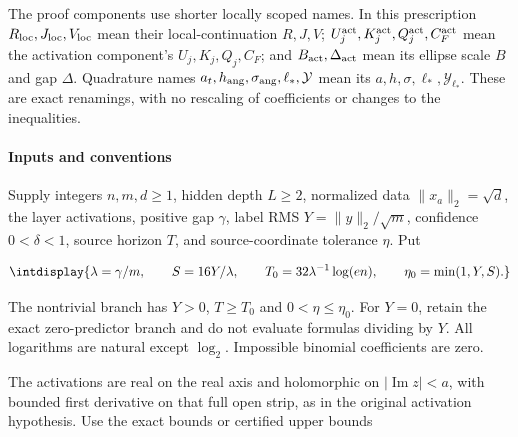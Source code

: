 
The proof components use shorter locally scoped names. In this prescription \(R_{\rm loc},\allowbreak J_{\rm loc},\allowbreak V_{\rm loc}\) mean their local-continuation \(R,\allowbreak J,\allowbreak V\); \(U_j^{\rm act},\allowbreak K_j^{\rm act},\allowbreak Q_j^{\rm act},\allowbreak C_F^{\rm act}\) mean the activation component's \(U_j,\allowbreak K_j,\allowbreak Q_j,\allowbreak C_F\); and \(B_{\rm act},\allowbreak \Delta_{\rm act}\) mean its ellipse scale \(B\) and gap \(\Delta\). Quadrature names \(a_t,\allowbreak h_{\rm ang},\allowbreak \sigma_{\rm ang},\allowbreak \ell_*,\allowbreak \mathcal Y\) mean its \(a,\allowbreak h,\allowbreak \sigma,\allowbreak \ell_*,\allowbreak \mathcal Y_{\ell_*}\). These are exact renamings, with no rescaling of coefficients or changes to the inequalities.


\paragraph{Inputs and conventions}
\label{int:setup-orders-detail-1}
\mbox{}\par\smallskip


Supply integers \(n,\allowbreak m,\allowbreak d\ge1\), hidden depth \(L\ge2\), normalized data \(\|x_a\|_2=\sqrt d\), the layer activations, positive gap \(\gamma\), label RMS \(Y=\|y\|_2/\sqrt m\), confidence \(0<\delta<1\), source horizon \(T\), and source-coordinate tolerance \(\eta\). Put


\begingroup\renewcommand{\theHequation}{intdisplay.233}
\begin{equation*}
\intdisplay{
\lambda=\gamma/m,\qquad S=16Y/\lambda,\qquad
T_0=32\lambda^{-1}\log(en),\qquad \eta_0=\min(1,Y,S).
}
\end{equation*}
\endgroup


The nontrivial branch has \(Y>0\), \(T\ge T_0\) and \(0<\eta\le\eta_0\). For \(Y=0\), retain the exact zero-predictor branch and do not evaluate formulas dividing by \(Y\). All logarithms are natural except \(\log_2\). Impossible binomial coefficients are zero.



The activations are real on the real axis and holomorphic on \(|\operatorname{Im}z|<a\), with bounded first derivative on that full open strip, as in the original activation hypothesis. Use the exact bounds or certified upper bounds


